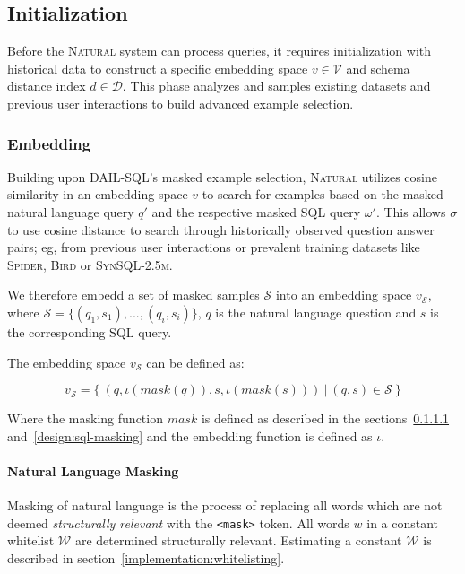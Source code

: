 \subsection{Initialization} %

Before the \textsc{Natural} system can process queries, it requires initialization
with historical data to construct a specific embedding space $v \in \mathcal{V}$ and
schema distance index $d \in \mathcal{D}$. This phase analyzes and samples existing
datasets and previous user interactions to build 
advanced example selection.

\subsubsection{Embedding}\label{design:embedding}

Building upon DAIL-SQL's masked example selection, \textsc{Natural} utilizes 
cosine similarity in an embedding space $v$ to search for examples based on the
masked natural language query $q'$ and the respective masked SQL query $\omega'$.
This allows $\sigma$ to use cosine distance to search through historically observed
question answer pairs; eg, from previous user interactions or prevalent training
datasets like \textsc{Spider}, \textsc{Bird} or \textsc{SynSQL-2.5m}.

We therefore embedd a set of masked samples $\mathcal{S}$ into an embedding space $v_{\mathcal{S}}$,
where $\mathcal{S} = \{(q_1, s_1), ..., (q_i, s_i)\}$, $q$ is the natural language
question and $s$ is the corresponding SQL query.

The embedding space $v_{\mathcal{S}}$ can be defined as:

$$v_{\mathcal{S}} = \{~(q, \iota(mask(q)), s, \iota(mask(s)))~|~(q, s) \in \mathcal{S}~\}$$

Where the masking function $mask$ is defined as described in the sections~\ref{design:nl-masking}
and~\ref{design:sql-masking} and the embedding function is defined as $\iota$.

\paragraph{Natural Language Masking}\label{design:nl-masking}

Masking of natural language is the process of replacing all words which are not
deemed \textit{structurally relevant} with the \texttt{<mask>} token. All words
$w$ in a constant whitelist $\mathcal{W}$ are determined structurally relevant.
Estimating a constant $\mathcal{W}$ is described in section~\ref{implementation:whitelisting}.

